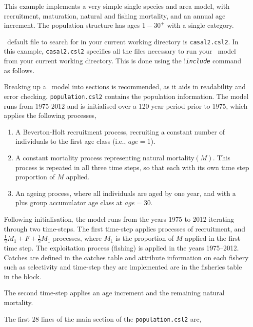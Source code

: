This example implements a very simple single species and area model, with recruitment, maturation, natural and fishing mortality, and an annual age increment. The population structure has ages $1-30^{+}$ with a single category.

\CNAME\ default file to search for in your current working directory is \texttt{casal2.csl2}. In this example, \texttt{casal2.csl2} specifies all the files necessary to run your \CNAME\ model from your current working directory. This is done using the !\texttt{\emph{include}} command as follows.
 

Breaking up a \CNAME\ model into sections is recommended, as it aids in readability and error checking. \texttt{population.csl2} contains the population information. The model runs from 1975-2012 and is initialised over a 120 year period prior to  1975, which applies the following processes,

\begin{enumerate}
\item A Beverton-Holt recruitment process, recruiting a constant number of individuals to the first age class (i.e., $age=1$).
\item A constant mortality process representing natural mortality$(M)$. This process is repeated in all three time steps, so that each with its own time step proportion of $M$ applied.

\item An ageing process, where all individuals are aged by one year, and with a plus group accumulator age class at $age=30$.
\end{enumerate}

Following initialisation, the model runs from the years 1975 to 2012 iterating through two time-steps. The first time-step applies processes of recruitment, and  $\frac{1}{2} M_1 + F + \frac{1}{2} M_1$ processes, where $M_1$ is the proportion of $M$ applied in the first time step. The exploitation process (fishing) is applied in the years 1975--2012. Catches are defined in the catches table and attribute information on each fishery such as selectivity and time-step they are implemented are in the fisheries table in the  block.

The second time-step applies an age increment and the remaining natural mortality.

The first 28 lines of the main section of the \texttt{population.csl2} are,
\pagebreak
 

